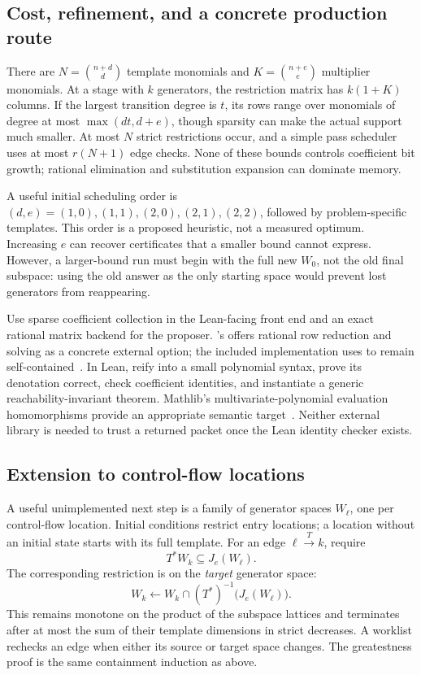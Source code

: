 \subsection{Cost, refinement, and a concrete production route}
There are $N=\binom{n+d}{d}$ template monomials and
$K=\binom{n+e}{e}$ multiplier monomials. At a stage with $k$ generators, the
restriction matrix has $k(1+K)$ columns. If the largest transition degree is
$t$, its rows range over monomials of degree at most $\max(dt,d+e)$, though
sparsity can make the actual support much smaller. At most $N$ strict
restrictions occur, and a simple pass scheduler uses at most $r(N+1)$ edge
checks. None of these bounds controls coefficient bit growth; rational
elimination and substitution expansion can dominate memory.

A useful initial scheduling order is $(d,e)=(1,0),(1,1),(2,0),(2,1),(2,2)$,
followed by problem-specific templates. This order is a proposed heuristic,
not a measured optimum. Increasing $e$ can recover certificates that a smaller
bound cannot express. However, a larger-bound run must begin with the full new
$W_0$, not the old final subspace: using the old answer as the only starting
space would prevent lost generators from reappearing.

Use sparse coefficient collection in the Lean-facing front end and an exact
rational matrix backend for the proposer. 's
 offers rational row reduction and solving as a concrete external
option; the included implementation uses  to remain
self-contained~\cite{flint-matrix}. In Lean, reify into a small polynomial syntax,
prove its denotation correct, check coefficient identities, and instantiate a
generic reachability-invariant theorem. Mathlib's multivariate-polynomial
evaluation homomorphisms provide an appropriate semantic target~\cite{mvpoly}.
Neither external library is needed to trust a returned packet once the Lean
identity checker exists.

\subsection{Extension to control-flow locations}
\label{sec:locations}
A useful unimplemented next step is a family of generator spaces $W_\ell$, one
per control-flow location. Initial conditions restrict entry locations; a
location without an initial state starts with its full template. For an edge
$\ell\xrightarrow{T}k$, require
\[
 T^*W_k\subseteq J_e(W_\ell).
\]
The corresponding restriction is on the \emph{target} generator space:
\[
 W_k\leftarrow W_k\cap(T^*)^{-1}\bigl(J_e(W_\ell)\bigr).
\]
This remains monotone on the product of the subspace lattices and terminates
after at most the sum of their template dimensions in strict decreases. A
worklist rechecks an edge when either its source or target space changes.
The greatestness proof is the same containment induction as above.

